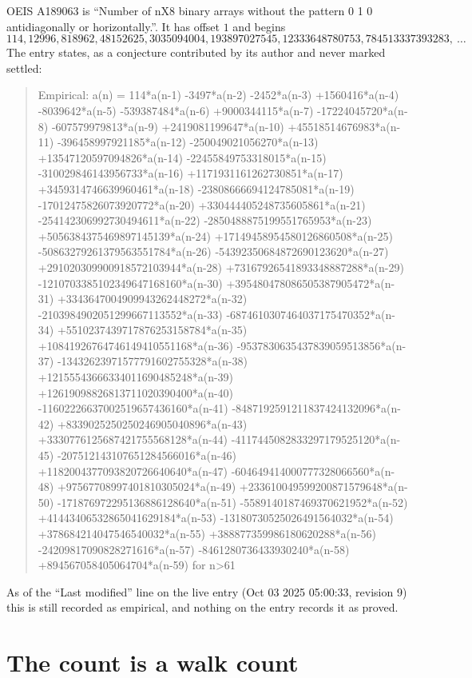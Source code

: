 \documentclass[11pt,a4paper]{article}
\theoremstyle{plain}
\theoremstyle{definition}
\begin{document}
OEIS A189063 is ``Number of nX8 binary arrays without the pattern 0 1 0 antidiagonally or horizontally.''. It has offset $1$ and begins
\[
114, 12996, 818962, 48152625, 3035094004, 193897027545, 12333648780753, 784513337393283,\ \dots
\]
The entry states, as a conjecture contributed by its author and never marked settled:
\begin{quote}
Empirical: a(n) = 114*a(n-1) -3497*a(n-2) -2452*a(n-3) +1560416*a(n-4) -8039642*a(n-5) -539387484*a(n-6) +9000344115*a(n-7) -17224045720*a(n-8) -607579979813*a(n-9) +2419081199647*a(n-10) +45518514676983*a(n-11) -396458997921185*a(n-12) -250049021056270*a(n-13) +13547120597094826*a(n-14) -22455849753318015*a(n-15) -310029846143956733*a(n-16) +1171931161262730851*a(n-17) +3459314746639960461*a(n-18) -23808666694124785081*a(n-19) -17012475826073920772*a(n-20) +330444405248735605861*a(n-21) -254142306992730494611*a(n-22) -2850488875199551765953*a(n-23) +5056384375469897145139*a(n-24) +17149458954580126860508*a(n-25) -50863279261379563551784*a(n-26) -54392350684872690123620*a(n-27) +291020309900918572103944*a(n-28) +73167926541893348887288*a(n-29) -1210703385102349647168160*a(n-30) +395480478086505387905472*a(n-31) +3343647004909943262448272*a(n-32) -2103984902051299667113552*a(n-33) -6874610307464037175470352*a(n-34) +5510237439717876253158784*a(n-35) +10841926764746149410551168*a(n-36) -9537830635437839059513856*a(n-37) -13432623971577791602755328*a(n-38) +12155543666334011690485248*a(n-39) +12619098826813711020390400*a(n-40) -11602226637002519657436160*a(n-41) -8487192591211837424132096*a(n-42) +8339025250250246905040896*a(n-43) +3330776125687421755568128*a(n-44) -4117445082833297179525120*a(n-45) -207512143107651284566016*a(n-46) +1182004377093820726640640*a(n-47) -604649414000777328066560*a(n-48) +97567708997401810305024*a(n-49) +233610049599200871579648*a(n-50) -171876972295136886128640*a(n-51) -5589140187469370621952*a(n-52) +41443406532865041629184*a(n-53) -13180730525026491564032*a(n-54) +378684214047546540032*a(n-55) +388877359986180620288*a(n-56) -24209817090828271616*a(n-57) -8461280736433930240*a(n-58) +894567058405064704*a(n-59) for n>61
\end{quote}
As of the ``Last modified'' line on the live entry (Oct 03 2025 05:00:33, revision 9) this is still
recorded as empirical, and nothing on the entry records it as proved.

\section{The count is a walk count}
\end{document}
